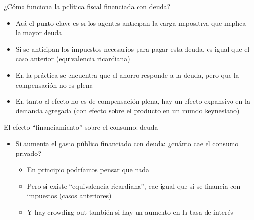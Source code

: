\documentclass{beamer}
\begin{document}
\begin{frame}{¿Cómo funciona la política fiscal financiada con deuda?}

    \begin{itemize}
    \item Acá el punto clave es si los agentes anticipan la carga impositiva que implica la mayor deuda
    \item Si se anticipan los impuestos necesarios para pagar esta deuda, es igual que el caso anterior (equivalencia ricardiana)
    \item En la práctica se encuentra que el ahorro responde a la deuda, pero que la compensación no es plena
    \item En tanto el efecto no es de compensación plena, hay un efecto expansivo en la demanda agregada (con efecto sobre el producto en un mundo keynesiano)

    \end{itemize}

\end{frame}


\begin{frame}{El efecto “financiamiento” sobre el consumo: deuda }
    
    \begin{itemize}
        \item Si aumenta el gasto público financiado con deuda: ¿cuánto cae el consumo privado?
        \begin{itemize}
            \item En principio podríamos pensar que nada 
            \item Pero si existe “equivalencia ricardiana”, cae igual que si se financia con impuestos (casos anteriores)
            \item Y hay crowding out también si hay un aumento en la tasa de interés 
        \end{itemize}
    \end{itemize}

\end{frame}
\end{document}
